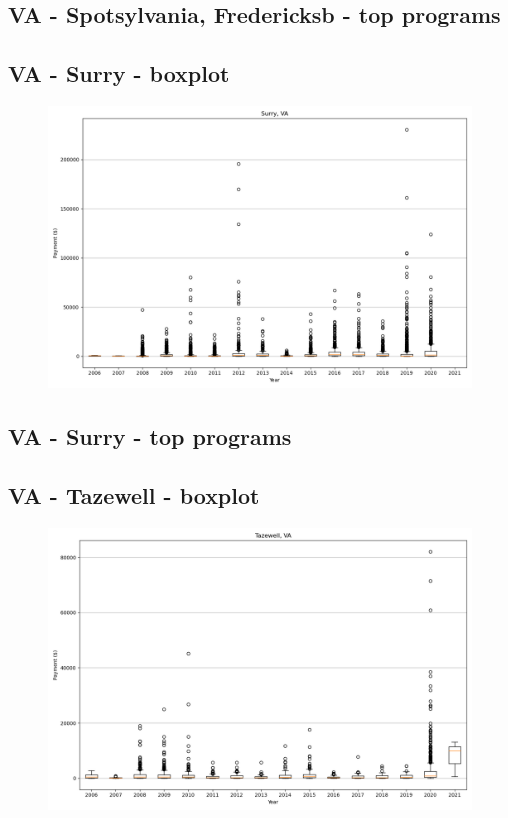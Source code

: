 \subsection*{VA - Spotsylvania, Fredericksb - top programs}

\newpage
\subsection*{VA - Surry - boxplot}
\begin{figure}[h]
\centering
\includegraphics[width=7in]{../output/boxplots/counties/Surry-VA_boxplot.png}
\end{figure}


\subsection*{VA - Surry - top programs}

\newpage
\subsection*{VA - Tazewell - boxplot}
\begin{figure}[h]
\centering
\includegraphics[width=7in]{../output/boxplots/counties/Tazewell-VA_boxplot.png}
\end{figure}



